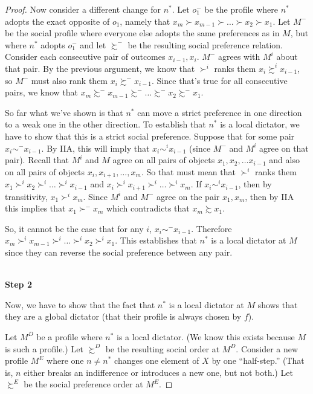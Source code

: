 \begin{proof}
Now consider a different change for $n^*$.  Let $o_1^-$ be the profile where $n^*$ adopts the exact opposite of $o_1$, namely that $x_m \succ x_{m-1} \succ \dots \succ x_2 \succ x_1$. Let $M^-$ be the social profile where everyone else adopts the same preferences as in $M$, but where $n^*$ adopts $o_1^-$ and let $\succsim^-$ be the resulting social preference relation. Consider each consecutive pair of outcomes $x_{i-1}, x_i$.  $M^-$ agrees with $M^i$ about that pair. By the previous argument, we know that $\succ^i$ ranks them  $x_i \succsim^i x_{i-1}$, so $M^-$ must also rank them  $x_i \succsim^- x_{i-1}$.  Since that's true for all consecutive pairs, we know that $x_m \succsim^- x_{m-1} \succsim^- \dots \succsim^- x_2 \succsim^- x_1$.

So far what we've shown is that $n^*$ can move a strict preference in one direction to a weak one in the other direction. To establish that $n^*$ is a local dictator, we have to show that this is a strict social preference.  Suppose that for some pair $x_i \sim^- x_{i-1}$. By IIA, this will imply that $x_i \sim^i x_{i-1}$ (since $M^-$ and $M^i$ agree on that pair).  Recall that $M^i$ and $M$ agree on all pairs of objects $x_1, x_2, \dots x_{i-1}$ and also on all pairs of objects $x_i, x_{i+1}, \dots, x_m$.  So that must mean that $\succ^i$ ranks them $x_1 \succ^i x_2 \succ^i \dots \succ^i x_{i-1}$  and $x_i \succ^i x_{i+1} \succ^i \dots \succ^i x_m$.  If $x_i \sim^i x_{i-1}$, then by transitivity, $x_1 \succ^i x_m$. Since $M^i$ and $M^-$ agree on the pair $x_1, x_m$, then by IIA this implies that $x_1 \succ^- x_m$ which contradicts that $x_m \succsim x_1$. 

So, it cannot be the case that for any $i$, $x_i \sim^- x_{i-1}$.  Therefore $x_m \succ^i x_{m-1} \succ^i \dots \succ^i x_2 \succ^i x_1$. This establishes that $n^*$ is a local dictator at $M$ since they can reverse the social preference between any pair.

~\\
\noindent \textbf{Step 2}

Now, we have to show that the fact that $n^*$ is a local dictator at $M$ shows that they are a global dictator (that their profile is always chosen by $f$).  

Let $M^D$ be a profile where $n^*$ is a local dictator. (We know this exists because $M$ is such a profile.) Let $\succsim^D$ be the resulting social order at $M^D$. Consider a new profile $M^E$ where one $n \ne n^*$ changes one element of $X$ by one ``half-step.''  (That is, $n$ either breaks an indifference or introduces a new one, but not both.)  Let $\succsim^E$ be the social preference order at $M^E$.


\end{proof}
